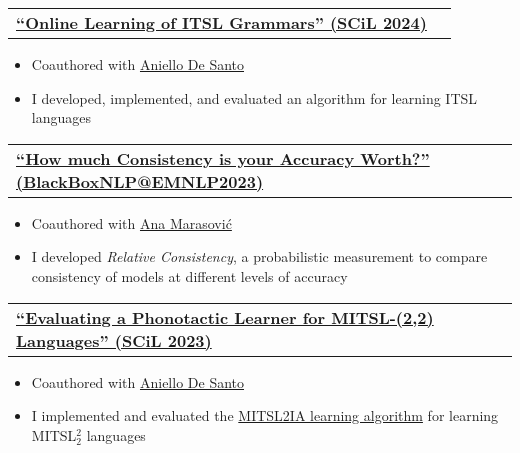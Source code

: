 \documentclass[letterpaper,11pt]{article}
\makeatletter
\newcommand{\resumeItem}[1]{
  \item{
    {#1 \vspace{-4pt}}
  }
}
\newcommand{\resumeSubheading}[4]{
  \vspace{-5pt}\item
    \begin{tabular*}{0.97\textwidth}[t]{l@{\extracolsep{\fill}}r}
      \textbf{#1} & #2 \\
    \end{tabular*}\vspace{-10pt}
}
\newcommand{\resumeItemListStart}{\begin{itemize}}
\newcommand{\resumeItemListEnd}{\end{itemize}\vspace{-5pt}}
\makeatother
\begin{document}
    \resumeSubheading
        {\href{https://aclanthology.org/2024.scil-1.23/}{``Online Learning of ITSL Grammars'' (SCiL 2024)}}{}{}{}
        \resumeItemListStart\small
             \resumeItem{Coauthored with \href{{https://aniellodesanto.github.io/}}{Aniello De Santo}}
            \resumeItem{I developed, implemented, and evaluated an algorithm for learning ITSL languages}
        \resumeItemListEnd

    \resumeSubheading
        {\href{https://aclanthology.org/2023.blackboxnlp-1.19/}{``How much Consistency is your Accuracy Worth?'' (BlackBoxNLP@EMNLP2023)}}{}{}{}
        \resumeItemListStart\small
            \resumeItem{Coauthored with \href{{https://www.anamarasovic.com/}}{Ana Marasović}}
            \resumeItem{I developed \textit{Relative Consistency}, a probabilistic measurement to compare consistency of models at different levels of accuracy}
        \resumeItemListEnd

    \resumeSubheading
        {\href{https://scholarworks.umass.edu/cgi/viewcontent.cgi?article=1268\&context=scil}{``Evaluating a Phonotactic Learner for MITSL-(2,2) Languages'' (SCiL 2023)}}{}{}{}
        \resumeItemListStart\small
             \resumeItem{Coauthored with \href{{https://aniellodesanto.github.io/}}{Aniello De Santo}}
            \resumeItem{I implemented and evaluated the \href{https://aclanthology.org/2021.scil-1.16.pdf}{MITSL2IA learning algorithm} for learning MITSL$_2^2$ languages}
        \resumeItemListEnd
\end{document}
